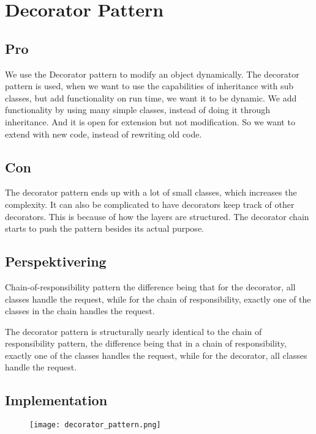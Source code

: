 \documentclass[../SWD_disp.tex]{subfiles}
\begin{document}
\section{Decorator Pattern}
\subsection{Pro}
We use the Decorator pattern to modify an object dynamically. The decorator pattern is used, when we want to use the capabilities of inheritance with sub classes, but add functionality on run time, we want it to be dynamic. We add functionality by using many simple classes, instead of doing it through inheritance. And it is open for extension but not modification. So we want to extend with new code, instead of rewriting old code.
\subsection{Con}
The decorator pattern ends up with a lot of small classes, which increases the complexity. It can also be complicated to have decorators keep track of other decorators. This is because of how the layers are structured. The decorator chain starts to push the pattern besides its actual purpose.

\subsection{Perspektivering}
Chain-of-responsibility pattern
the difference being that for the decorator, all classes handle the request, while for the chain of responsibility, exactly one of the classes in the chain handles the request.

The decorator pattern is structurally nearly identical to the chain of responsibility pattern, the difference being that in a chain of responsibility, exactly one of the classes handles the request, while for the decorator, all classes handle the request.
\subsection{Implementation}


\begin{figure}[H]
    \centering
    \texttt{[image: decorator\_pattern.png]}
\end{figure}
\end{document}
